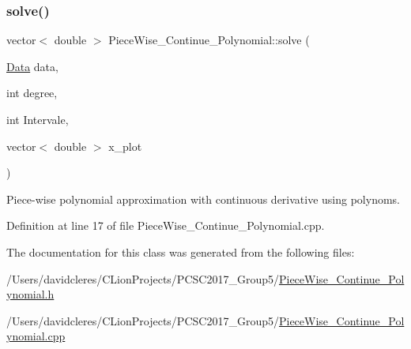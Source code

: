 \subsubsection{\texorpdfstring{solve()}{solve()}}
{\footnotesize\ttfamily vector$<$ double $>$ Piece\+Wise\+\_\+\+Continue\+\_\+\+Polynomial\+::solve (\begin{DoxyParamCaption}\item[{\mbox{\hyperlink{struct_data}{Data}}}]{data,  }\item[{int}]{degree,  }\item[{int}]{Intervale,  }\item[{vector$<$ double $>$}]{x\+\_\+plot }\end{DoxyParamCaption})}



Piece-\/wise polynomial approximation with continuous derivative using polynoms. 



Definition at line 17 of file Piece\+Wise\+\_\+\+Continue\+\_\+\+Polynomial.\+cpp.



The documentation for this class was generated from the following files\+:\begin{DoxyCompactItemize}
\item 
/\+Users/davidcleres/\+C\+Lion\+Projects/\+P\+C\+S\+C2017\+\_\+\+Group5/\mbox{\hyperlink{_piece_wise___continue___polynomial_8h}{Piece\+Wise\+\_\+\+Continue\+\_\+\+Polynomial.\+h}}\item 
/\+Users/davidcleres/\+C\+Lion\+Projects/\+P\+C\+S\+C2017\+\_\+\+Group5/\mbox{\hyperlink{_piece_wise___continue___polynomial_8cpp}{Piece\+Wise\+\_\+\+Continue\+\_\+\+Polynomial.\+cpp}}\end{DoxyCompactItemize}
